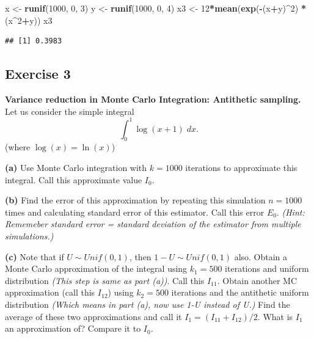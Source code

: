 \documentclass[
]{article}
\newenvironment{Shaded}{\begin{snugshade}}{\end{snugshade}}
\newcommand{\DecValTok}[1]{\textcolor[rgb]{0.00,0.00,0.81}{#1}}
\newcommand{\KeywordTok}[1]{\textcolor[rgb]{0.13,0.29,0.53}{\textbf{#1}}}
\newcommand{\NormalTok}[1]{#1}
\newcommand{\OperatorTok}[1]{\textcolor[rgb]{0.81,0.36,0.00}{\textbf{#1}}}
\newcommand{\StringTok}[1]{\textcolor[rgb]{0.31,0.60,0.02}{#1}}
\begin{document}
\begin{Shaded}
\begin{Highlighting}[]
\NormalTok{x <-}\StringTok{ }\KeywordTok{runif}\NormalTok{(}\DecValTok{1000}\NormalTok{, }\DecValTok{0}\NormalTok{, }\DecValTok{3}\NormalTok{)}
\NormalTok{y <-}\StringTok{ }\KeywordTok{runif}\NormalTok{(}\DecValTok{1000}\NormalTok{, }\DecValTok{0}\NormalTok{, }\DecValTok{4}\NormalTok{)}
\NormalTok{x3 <-}\StringTok{ }\DecValTok{12}\OperatorTok{*}\KeywordTok{mean}\NormalTok{(}\KeywordTok{exp}\NormalTok{(}\OperatorTok{-}\NormalTok{(x}\OperatorTok{+}\NormalTok{y)}\OperatorTok{^}\DecValTok{2}\NormalTok{) }\OperatorTok{*}\StringTok{ }\NormalTok{(x}\OperatorTok{^}\DecValTok{2}\OperatorTok{+}\NormalTok{y))}
\NormalTok{x3}
\end{Highlighting}
\end{Shaded}

\begin{verbatim}
## [1] 0.3983
\end{verbatim}

\hypertarget{exercise-3}{%
\subsection{Exercise 3}\label{exercise-3}}

\textbf{Variance reduction in Monte Carlo Integration: Antithetic
sampling.} Let us consider the simple integral
\[ \int_0^1 \log(x+1) \; dx. \] (where \(\log(x)=\ln(x)\))

\textbf{(a)} Use Monte Carlo integration with \(k = 1000\) iterations to
approximate this integral. Call this approximate value \(I_0\).

\textbf{(b)} Find the error of this approximation by repeating this
simulation \(n = 1000\) times and calculating standard error of this
estimator. Call this error \(E_0\). \emph{(Hint: Rememeber standard
error = standard deviation of the estimator from multiple simulations.)}

\textbf{(c)} Note that if \(U \sim Unif(0,1)\), then
\(1 - U \sim Unif(0,1)\) also. Obtain a Monte Carlo approximation of the
integral using \(k_1 = 500\) iterations and uniform distribution
\emph{(This step is same as part (a))}. Call this \(I_{11}\). Obtain
another MC approximation (call this \(I_{12}\)) using \(k_2 = 500\)
iterations and the antithetic uniform distribution \emph{(Which means in
part (a), now use 1-U instead of U.)} Find the average of these two
approximations and call it \(I_1 = (I_{11}+I_{12})/2\). What is \(I_1\)
an approximation of? Compare it to \(I_0\).
\end{document}
